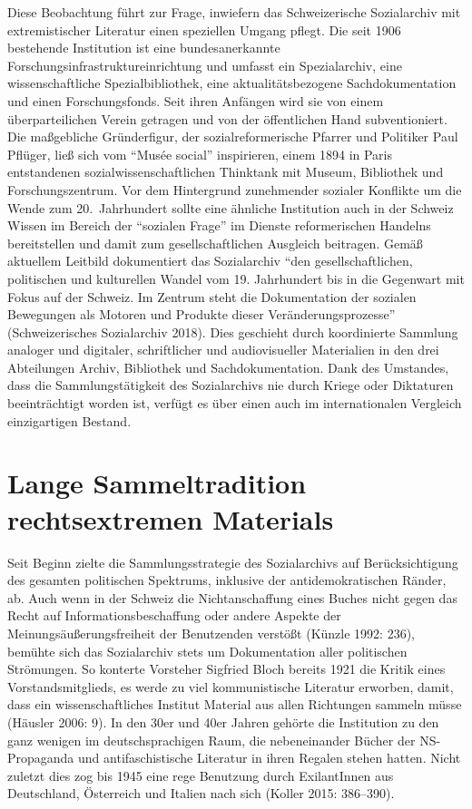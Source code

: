\documentclass[a4paper,
fontsize=11pt,
oneside,
numbers=noperiodatend,
parskip=half-,
bibliography=totoc,
final
]{scrartcl}
\begin{document}
Diese Beobachtung führt zur Frage, inwiefern das Schweizerische
Sozialarchiv mit extremistischer Literatur einen speziellen Umgang
pflegt. Die seit 1906 bestehende Institution ist eine bundesanerkannte
Forschungsinfrastruktureinrichtung und umfasst ein Spezialarchiv, eine
wissenschaftliche Spezialbibliothek, eine aktualitätsbezogene
Sachdokumentation und einen Forschungsfonds. Seit ihren Anfängen wird
sie von einem überparteilichen Verein getragen und von der öffentlichen
Hand subventioniert. Die maßgebliche Gründerfigur, der
sozialreformerische Pfarrer und Politiker Paul Pflüger, ließ sich vom
\enquote{Musée social} inspirieren, einem 1894 in Paris entstandenen
sozialwissenschaftlichen Thinktank mit Museum, Bibliothek und
Forschungszentrum. Vor dem Hintergrund zunehmender sozialer Konflikte um
die Wende zum 20.~Jahrhundert sollte eine ähnliche Institution auch in
der Schweiz Wissen im Bereich der \enquote{sozialen Frage} im Dienste
reformerischen Handelns bereitstellen und damit zum gesellschaftlichen
Ausgleich beitragen. Gemäß aktuellem Leitbild dokumentiert das
Sozialarchiv \enquote{den gesellschaftlichen, politischen und
kulturellen Wandel vom 19. Jahrhundert bis in die Gegenwart mit Fokus
auf der Schweiz. Im Zentrum steht die Dokumentation der sozialen
Bewegungen als Motoren und Produkte dieser Veränderungsprozesse}
(Schweizerisches Sozialarchiv 2018). Dies geschieht durch koordinierte
Sammlung analoger und digitaler, schriftlicher und audiovisueller
Materialien in den drei Abteilungen Archiv, Bibliothek und
Sachdokumentation. Dank des Umstandes, dass die Sammlungstätigkeit des
Sozialarchivs nie durch Kriege oder Diktaturen beeinträchtigt worden
ist, verfügt es über einen auch im internationalen Vergleich
einzigartigen Bestand.

\hypertarget{lange-sammeltradition-rechtsextremen-materials}{%
\section*{Lange Sammeltradition rechtsextremen
Materials}\label{lange-sammeltradition-rechtsextremen-materials}}

Seit Beginn zielte die Sammlungsstrategie des Sozialarchivs auf
Berücksichtigung des gesamten politischen Spektrums, inklusive der
antidemokratischen Ränder, ab. Auch wenn in der Schweiz die
Nichtanschaffung eines Buches nicht gegen das Recht auf
Informationsbeschaffung oder andere Aspekte der
Meinungsäußerungsfreiheit der Benutzenden verstößt (Künzle 1992: 236),
bemühte sich das Sozialarchiv stets um Dokumentation aller politischen
Strömungen. So konterte Vorsteher Sigfried Bloch bereits 1921 die Kritik
eines Vorstandsmitglieds, es werde zu viel kommunistische Literatur
erworben, damit, dass ein wissenschaftliches Institut Material aus allen
Richtungen sammeln müsse (Häusler 2006: 9). In den 30er und 40er Jahren
gehörte die Institution zu den ganz wenigen im deutschsprachigen Raum,
die nebeneinander Bücher der NS-Propaganda und antifaschistische
Literatur in ihren Regalen stehen hatten. Nicht zuletzt dies zog bis
1945 eine rege Benutzung durch ExilantInnen aus Deutschland, Österreich
und Italien nach sich (Koller 2015: 386--390).
\end{document}
